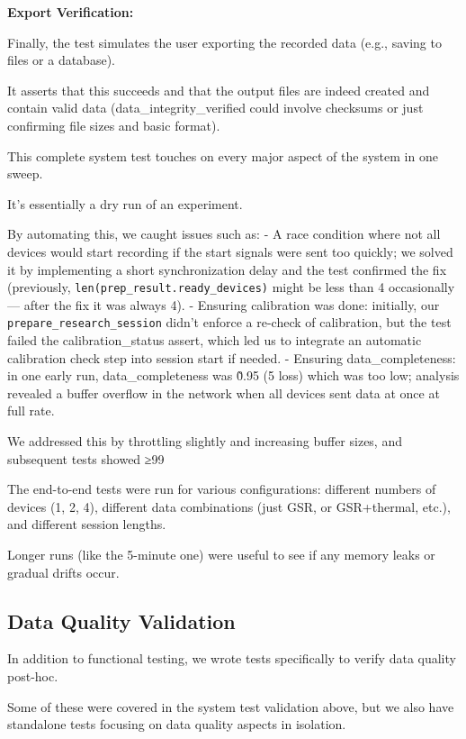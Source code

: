 {{\textbf{Export Verification:}

Finally, the test simulates the user exporting the recorded data (e.g., saving to
files or a database).

It asserts that this succeeds and that the output files are indeed created and
contain valid data (data\_integrity\_verified could involve checksums or just
confirming file sizes and basic format).

This complete system test touches on every major aspect of the system in one sweep.

It's essentially a dry run of an experiment.

By automating this, we caught issues such as: - A race condition where not all
devices would start recording if the start signals were sent too quickly; we solved
it by implementing a short synchronization delay and the test confirmed the fix
(previously, \texttt{len(prep\_result.ready\_devices)} might be less than 4
occasionally --- after the fix it was always 4).  - Ensuring calibration was done:
initially, our \texttt{prepare\_research\_session} didn't enforce a re-check of
calibration, but the test failed the calibration\_status assert, which led us to
integrate an automatic calibration check step into session start if needed.  -
Ensuring data\_completeness: in one early run, data\_completeness was \~0.95 (5%
loss) which was too low; analysis revealed a buffer overflow in the network when all
devices sent data at once at full rate.

We addressed this by throttling slightly and increasing buffer sizes, and subsequent
tests showed ≥99%

The end-to-end tests were run for various configurations: different numbers of
devices (1, 2, 4), different data combinations (just GSR, or GSR+thermal, etc.), and
different session lengths.

Longer runs (like the 5-minute one) were useful to see if any memory leaks or gradual
drifts occur.

\subsection{Data Quality Validation}

In addition to functional testing, we wrote tests specifically to verify data quality
post-hoc.

Some of these were covered in the system test validation above, but we also have
standalone tests focusing on data quality aspects in isolation.

}}
